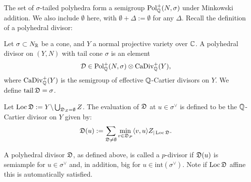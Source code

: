 The set of \(\sigma\)-tailed polyhedra form a semigroup \(\operatorname{Pol}_{\mathbb{Q}}^+(N,\sigma)\) under Minkowski addition. We also include \(\emptyset\) here, with \(\emptyset + \Delta := \emptyset\) for any \(\Delta\). Recall the definition of a polyhedral divisor:
\begin{definition}
Let \(\sigma \subset N_{\mathbb{R}}\) be a cone, and \(Y\) a normal projective variety over \(\mathbb{C}\). A polyhedral divisor on \((Y,N)\) with tail cone \(\sigma\) is an element
\[
\mathcal{D} \in \operatorname{Pol}_{\mathbb{Q}}^+(N,\sigma) \otimes \operatorname{CaDiv}_{\mathbb{Q}}^+(Y),
\]
where \(\operatorname{CaDiv}_{\mathbb{Q}}^+(Y)\) is the semigroup of effective \(\mathbb{Q}\)-Cartier divisors on \(Y\). We define \(\operatorname{tail} {\mathfrak{D}} = \sigma\).
\end{definition}
Let \(\operatorname{Loc} {\mathfrak{D}} := Y \backslash \bigcup_{{\mathfrak{D}}_Z = \emptyset} Z\). The evaluation of \({\mathfrak{D}}\) at \(u \in \sigma^\vee\) is defined to be the \(\mathbb{Q}\)-Cartier divisor on \(Y\) given by:
\[
{\mathfrak{D}}(u) :=  \sum_{{\mathfrak{D}} \neq \emptyset} \min_{v \in {\mathfrak{D}}_P} \langle v,u \rangle Z_{|\operatorname{Loc} {\mathfrak{D}}}.
\]
\begin{definition}
A polyhedral divisor \({\mathfrak{D}}\), as defined above, is called a \(p\)-divisor if \({\mathfrak{D}}(u)\) is semiample for \(u \in \sigma^\vee\) and, in addition, big for \(u \in \text{int}(\sigma^\vee)\). Note if \(\operatorname{Loc} {\mathfrak{D}}\) affine this is automatically satisfied.
\end{definition}

